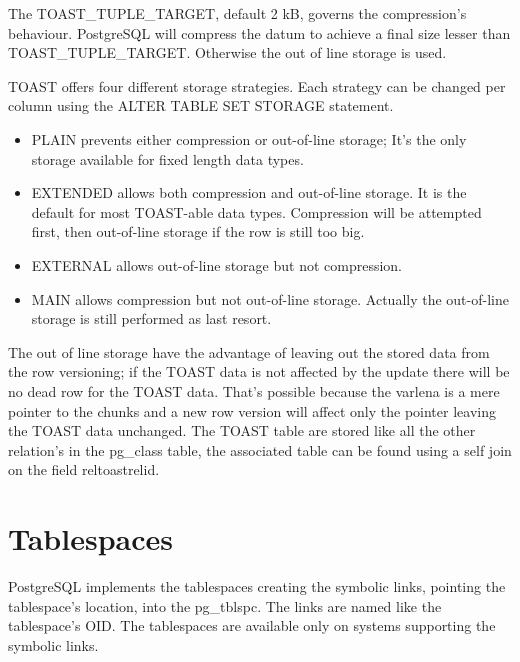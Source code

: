 The TOAST\_TUPLE\_TARGET, default 2 kB, governs the compression's behaviour. PostgreSQL will compress the 
datum to achieve a final size lesser than TOAST\_TUPLE\_TARGET. Otherwise the out of line storage is used.

TOAST offers four different storage strategies. Each strategy can be changed per column using the  ALTER 
TABLE SET STORAGE statement.
\begin{itemize}

\item  PLAIN prevents either compression or out-of-line storage; It's the only storage available 
for fixed length data types.

\item  EXTENDED allows both compression and out-of-line storage. It is the default for most 
TOAST-able data types. Compression will be attempted first, then out-of-line storage if the row is 
still too big.

\item  EXTERNAL allows out-of-line storage but not compression. 

\item  MAIN allows compression but not out-of-line storage. Actually the out-of-line storage is 
still performed as last resort.

\end{itemize}

The out of line storage have the advantage of leaving out the 
stored data from the row versioning; if the TOAST data is not affected by the update there will be 
no dead row for the TOAST data. That's possible because the varlena is a mere pointer to the chunks 
and a new row version will affect only the pointer leaving the TOAST data unchanged.\newline
The TOAST table are stored like all the other relation's in the pg\_class table, the associated 
table can be found using a self join on the field reltoastrelid.\newline


\section{Tablespaces}
\label{sub:TBS-PHYSICAL}
PostgreSQL implements the tablespaces creating the symbolic links, pointing the tablespace's 
location, into the pg\_tblspc. The links are named like the tablespace's OID. The tablespaces are 
available only on systems supporting the symbolic links.\newline

